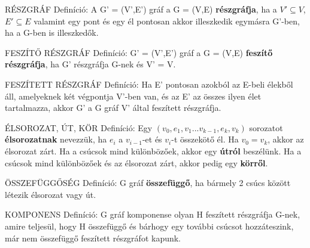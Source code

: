 \documentclass[]{article}
\begin{document}
\begin{shaded}
RÉSZGRÁF Definíció: A G' = (V',E') gráf a G = (V,E) \textbf{részgráfja}, ha a $V' \subseteq V$, $E' \subseteq E$ valamint egy pont és egy él pontosan akkor illeszkedik egymásra G'-ben, ha a G-ben is illeszkedők.
\end{shaded}
\begin{shaded}
FESZÍTŐ RÉSZGRÁF Definíció: G' = (V',E') gráf a G = (V,E)\textbf{ feszítő részgráfja}, ha G' részgráfja G-nek és V' = V.
\end{shaded}
\begin{shaded}
FESZÍTETT RÉSZGRÁF Definíció: Ha E' pontosan azokból az E-beli élekből áll, amelyeknek két végpontja V'-ben van, és az E' az összes ilyen élet tartalmazza, akkor G' a G gráf V' által feszített részgráfja.
\end{shaded}
\begin{shaded}
ÉLSOROZAT, ÚT, KÖR Definíció: Egy $(v_0, e_1, v_1 ... v_{k-1}, e_k, v_k)$ sorozatot \textbf{élsorozatnak} nevezzük, ha $e_i$ a $v_{i-1}$-et és $v_i$-t összekötő él. Ha $v_0 = v_k$, akkor az élsorozat zárt. Ha a csúcsok mind különbözőek, akkor egy \textbf{útról} beszélünk. Ha a csúcsok mind különbözőek és az élsorozat zárt, akkor pedig egy \textbf{körről}.
\end{shaded}
\begin{shaded}
ÖSSZEFÜGGŐSÉG Definíció: G gráf \textbf{összefüggő}, ha bármely 2 csúcs között létezik élsorozat vagy út.
\end{shaded}
\begin{shaded}
KOMPONENS Definíció: G gráf komponense olyan H feszített részgráfja G-nek, amire teljesül, hogy H összefüggő és bárhogy egy további csúcsot hozzáteszink, már nem összefüggő feszített részgráfot kapunk.
\end{shaded}
\end{document}
